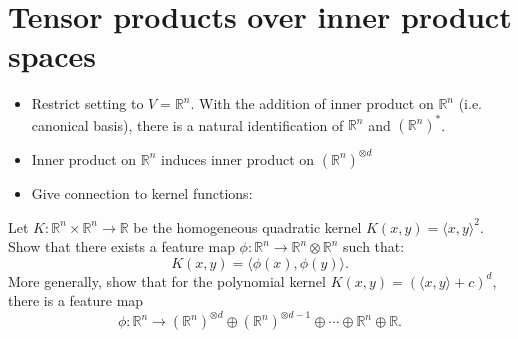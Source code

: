\section{Tensor products over inner product spaces}

\begin{itemize}
    \item Restrict setting to $V = \mathbb{R}^n$. With the addition of
      inner product on $\mathbb{R}^n$ (i.e. canonical basis), there is
      a natural identification of $\mathbb{R}^n$ and
      $(\mathbb{R}^n)^*$. 
    \item Inner product on $\mathbb{R}^n$ induces inner product on
      $(\mathbb{R}^n)^{\otimes d}$ 
    \item Give connection to kernel functions:
\end{itemize}

\begin{exercise}
Let $K : \mathbb{R}^n \times \mathbb{R}^n \to \mathbb{R}$ be the
homogeneous quadratic kernel $K(x,y) = \langle x, y\rangle^2$. Show
that there exists a feature map $\phi: \mathbb{R}^n \to \mathbb{R}^n
\otimes \mathbb{R}^n$ such that: 
\[K(x,y) = \langle \phi(x), \phi(y)\rangle.\]
More generally, show that for the polynomial kernel $K(x,y) = (\langle
x,y\rangle + c)^d$, there is a feature map \[\phi: \mathbb{R}^n \to
(\mathbb{R}^n)^{\otimes d} \oplus (\mathbb{R}^n)^{\otimes d-1}\oplus
\dotsm \oplus \mathbb{R}^n \oplus \mathbb{R}.\]  
\end{exercise}
